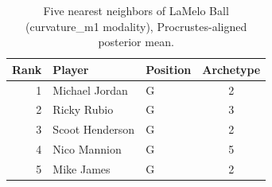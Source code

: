 \begin{table}[htbp]
  \centering\small
  \begin{tabular}{rllc}
    \toprule
    Rank & Player & Position & Archetype \\
    \midrule
    1 & Michael Jordan & G & 2 \\
    2 & Ricky Rubio & G & 3 \\
    3 & Scoot Henderson & G & 2 \\
    4 & Nico Mannion & G & 5 \\
    5 & Mike James & G & 2 \\
    \bottomrule
  \end{tabular}
  \caption{Five nearest neighbors of LaMelo Ball (curvature_m1 modality), Procrustes-aligned posterior mean.}
  \label{tab:LaMelo_Ball_neighbors_curvature_m1}
\end{table}

